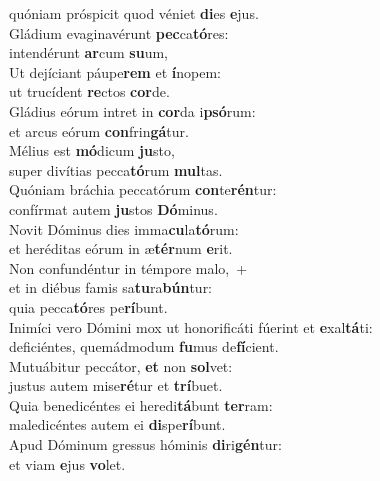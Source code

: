 \oddverse quóniam próspicit quod véniet \textbf{di}es \textbf{e}jus.\\
\evenverse Gládium evaginavérunt \textbf{pec}ca\textbf{tó}res:~\*\\
\evenverse intendérunt \textbf{ar}cum \textbf{su}um,\\
\oddverse Ut dejíciant páupe\textbf{rem} et \textbf{í}nopem:~\*\\
\oddverse ut trucídent \textbf{re}ctos \textbf{cor}de.\\
\evenverse Gládius eórum intret in \textbf{cor}da i\textbf{psó}rum:~\*\\
\evenverse et arcus eórum \textbf{con}frin\textbf{gá}tur.\\
\oddverse Mélius est \textbf{mó}dicum \textbf{ju}sto,~\*\\
\oddverse super divítias pecca\textbf{tó}rum \textbf{mul}tas.\\
\evenverse Quóniam bráchia peccatórum \textbf{con}te\textbf{rén}tur:~\*\\
\evenverse confírmat autem \textbf{ju}stos \textbf{Dó}minus.\\
\oddverse Novit Dóminus dies imma\textbf{cu}la\textbf{tó}rum:~\*\\
\oddverse et heréditas eórum in æ\textbf{tér}num \textbf{e}rit.\\
\evenverse Non confundéntur in témpore malo,~+\\
\evenverse  et in diébus famis sa\textbf{tu}ra\textbf{bún}tur:~\*\\
\evenverse quia pecca\textbf{tó}res pe\textbf{rí}bunt.\\
\oddverse Inimíci vero Dómini mox ut honorificáti fúerint et \textbf{e}xal\textbf{tá}ti:~\*\\
\oddverse deficiéntes, quemádmodum \textbf{fu}mus de\textbf{fí}cient.\\
\evenverse Mutuábitur peccátor, \textbf{et} non \textbf{sol}vet:~\*\\
\evenverse justus autem mise\textbf{ré}tur et \textbf{trí}buet.\\
\oddverse Quia benedicéntes ei heredi\textbf{tá}bunt \textbf{ter}ram:~\*\\
\oddverse maledicéntes autem ei \textbf{di}spe\textbf{rí}bunt.\\
\evenverse Apud Dóminum gressus hóminis \textbf{di}ri\textbf{gén}tur:~\*\\
\evenverse et viam \textbf{e}jus \textbf{vo}let.\\
